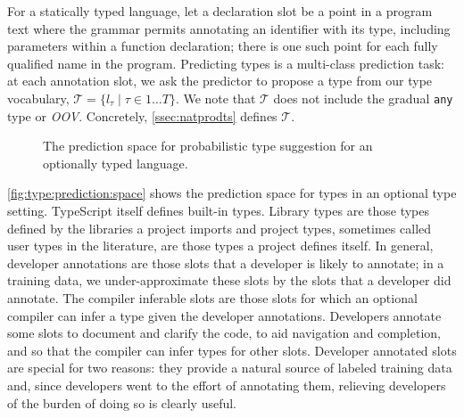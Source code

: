 \documentclass[acmsmall, review, anonymous]{acmart}\settopmatter{printfolios=true,printccs=false,printacmref=false}
\begin{document}

For a statically typed language, let a declaration slot be a point in a program text where the grammar permits annotating an identifier with its type, including parameters within a function declaration; there is one such point for each fully qualified name in the program.  Predicting types is a multi-class prediction task: at each annotation slot, we ask the predictor to propose a type from our type vocabulary, $\mathcal{T} = \{ l_\tau \mid \tau \in 1 \dots T \}$. We note that $\mathcal{T}$ does not include the gradual \texttt{any} type or \textit{OOV}.  Concretely,
\autoref{ssec:natprodts} defines $\mathcal{T}$.

\begin{figure*}[t]
    \centering
    \def\svgwidth{0.8\linewidth}
    
    \caption{The prediction space for probabilistic type suggestion for an optionally typed language.}
    \label{fig:type:prediction:space}
\end{figure*}

\autoref{fig:type:prediction:space} shows the prediction space for types in an optional type setting.
TypeScript itself defines built-in types.  Library types are those types defined by the libraries a project imports and project types, sometimes called user types in the literature, are those types a project defines itself. 
In general, developer annotations are those slots that a developer is likely to annotate; in a training data, we under-approximate these slots by the slots that a developer did annotate. 
The compiler inferable slots are those slots for which an optional compiler can infer a type given the developer annotations.  
Developers annotate some slots to document and clarify the code, to aid navigation and completion, and so that the compiler can infer types for other slots.  
Developer annotated slots are special for two reasons:  they provide a natural source of labeled training data and, since developers went to the effort of annotating them, relieving developers of the burden of doing so is clearly useful.
\end{document}
